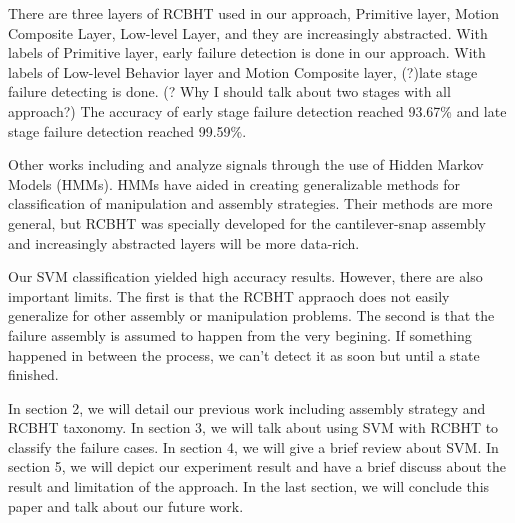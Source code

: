 \indent There are three layers of RCBHT used in our approach, Primitive layer, Motion Composite Layer, Low-level Layer, and they are increasingly abstracted. With labels of Primitive layer, early failure detection is done in our approach. With labels of Low-level Behavior layer and Motion Composite layer, (?)late stage failure detecting is done. (? Why I should talk about two stages with all approach?) The accuracy of early stage failure detection reached 93.67\% and late stage failure detection reached 99.59\%.

\indent Other works including \cite{rodriguez2011abort} and \cite{di2013bayesian} analyze signals through the use of Hidden Markov Models (HMMs). HMMs have aided in creating generalizable methods for classification of manipulation and assembly strategies. Their methods are more general, but RCBHT was specially developed for the cantilever-snap assembly and increasingly abstracted layers will be more data-rich.

\indent Our SVM classification yielded high accuracy results. However, there are also important limits. The first is that the RCBHT appraoch does not easily generalize for other assembly or manipulation problems. The second is that the failure assembly is assumed to happen from the very begining. If something happened in between the process, we can't detect it as soon but until a state finished.

\indent In section 2, we will detail our previous work including assembly strategy and RCBHT taxonomy. In section 3, we will talk about using SVM with RCBHT to classify the failure cases. In section 4, we will give a brief review about SVM. In section 5, we will depict our experiment result and have a brief discuss about the result and limitation of the approach. In the last section, we will conclude this paper and talk about our future work.
